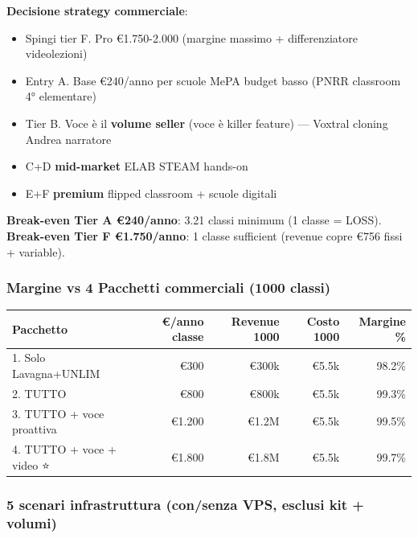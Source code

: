 \documentclass[12pt,a4paper]{article}
\begin{document}
\textbf{Decisione strategy commerciale}:
\begin{itemize}[leftmargin=*]
  \item Spingi tier F. Pro €1.750-2.000 (margine massimo + differenziatore videolezioni)
  \item Entry A. Base €240/anno per scuole MePA budget basso (PNRR classroom 4° elementare)
  \item Tier B. Voce è il \textbf{volume seller} (voce è killer feature) — Voxtral cloning Andrea narratore
  \item C+D \textbf{mid-market} ELAB STEAM hands-on
  \item E+F \textbf{premium} flipped classroom + scuole digitali
\end{itemize}

\textbf{Break-even Tier A €240/anno}: 3.21 classi minimum (1 classe = LOSS).
\textbf{Break-even Tier F €1.750/anno}: 1 classe sufficient (revenue copre €756 fissi + variable).

\subsubsection*{Margine vs 4 Pacchetti commerciali (1000 classi)}

\begin{center}
\begin{tabular}{lrrrr}
\toprule
\textbf{Pacchetto} & \textbf{€/anno classe} & \textbf{Revenue 1000} & \textbf{Costo 1000} & \textbf{Margine \%} \\
\midrule
1. Solo Lavagna+UNLIM      & €300      & €300k    & €5.5k & 98.2\% \\
2. TUTTO                    & €800      & €800k    & €5.5k & 99.3\% \\
3. TUTTO + voce proattiva   & €1.200    & €1.2M    & €5.5k & 99.5\% \\
4. TUTTO + voce + video ⭐  & €1.800    & €1.8M    & €5.5k & 99.7\% \\
\bottomrule
\end{tabular}
\end{center}

\subsubsection*{5 scenari infrastruttura (con/senza VPS, esclusi kit + volumi)}
\end{document}
